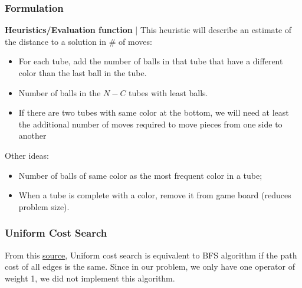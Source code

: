 \documentclass{beamer}
\begin{document}
\begin{frame}
  \frametitle{Formulation}
  \textbf{Heuristics/Evaluation function} | This heuristic will describe an estimate of the distance to a solution in \# of moves:
  \begin{itemize}
    \item For each tube, add the number of balls in that tube that have a different color than the last ball in the tube.
    \item Number of balls in the $N-C$ tubes with least balls.
    \item If there are two tubes with same color at the bottom, we will need at least the additional number of moves required to move pieces from one side to another
  \end{itemize}

  Other ideas:
  \begin{itemize}
    \item Number of balls of same color as the most frequent color in a tube;
    \item When a tube is complete with a color, remove it from game board (reduces problem size).
  \end{itemize}
\end{frame}

\begin{frame}
  \frametitle{Uniform Cost Search}
  From this \href{https://www.javatpoint.com/ai-uninformed-search-algorithms}{source}, 
  Uniform cost search is equivalent to BFS algorithm if the path cost of all edges is the same.
  Since in our problem, we only have one operator of weight 1, we did not implement this algorithm.
\end{frame}
\end{document}
